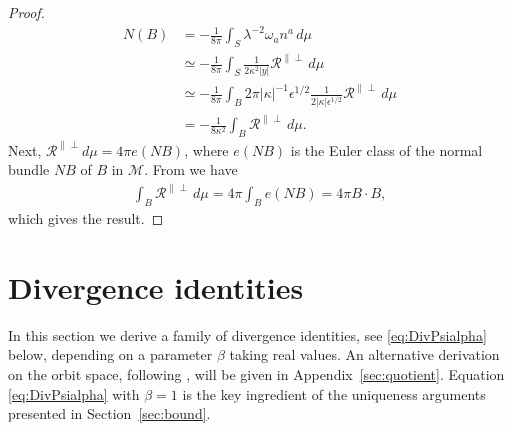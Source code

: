 \documentclass[a4paper,10pt,reqno]{amsart}
\newcommand{\bolt}{B}
\newcommand{\cR}{\mathcal{R}}
\newcommand{\cM}{\mathcal{M}}
\theoremstyle{plain}
\newcommand{\eps}{\epsilon}
\numberwithin{equation}{section}
\begin{document}
\begin{proof}
\begin{align}
N(\bolt) 
&= -\frac{1}{8\pi} \int_S \lambda^{-2} \omega_a n^a \, d\mu \nonumber \\
&\simeq
- \frac{1}{8\pi} 
\int_S \frac{1}{2\kappa^2|y|}\cR^{\parallel\perp} \, d\mu \nonumber \\
&\simeq
- \frac{1}{8\pi} 
\int_\bolt 2\pi |\kappa|^{-1}\eps^{1/2}
\frac{1}{2|\kappa| \eps^{1/2}}\cR^{\parallel\perp} \, d\mu \nonumber \\
&=
- \frac{1}{8 \kappa^2} 
\int_\bolt \cR^{\parallel\perp} \, d\mu.
\end{align}
Next, $\mathcal{R}^{\parallel\perp} d\mu = 4\pi e(NB)$, where $e(NB)$ is the Euler class of the normal bundle $NB$ of $B$ in $\cM$. From \cite[Theorem~11.17]{BottTu} we have
\begin{align}
\int_\bolt\mathcal{R}^{\parallel\perp} \, d\mu
= 4\pi \int_\bolt e(NB)
= 4\pi \bolt\!\cdot\! \bolt ,
\end{align} 
which gives the result. 
\end{proof}


%
\section{Divergence identities} \label{sec:divident}
%

In this section we derive a family of divergence identities, see  \eqref{eq:DivPsialpha} below, depending on a parameter $\beta$ taking real values. An alternative derivation on the orbit space, following \cite{MR747036,simon:1995}, will be given in Appendix~\ref{sec:quotient}. Equation \eqref{eq:DivPsialpha} with $\beta =1$ is the key ingredient of the uniqueness arguments presented in Section~\ref{sec:bound}. 
\end{document}

